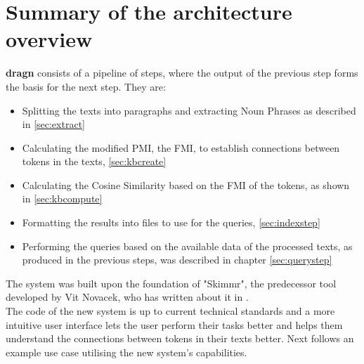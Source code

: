 \section{Summary of the architecture overview}
\textbf{dragn} consists of a pipeline of steps, where the output of the previous step forms the basis for the next step. They are:
\begin{itemize}
\item Splitting the texts into paragraphs and extracting Noun Phrases as described in \ref{sec:extract}
\item Calculating the modified PMI, the FMI, to establish connections between tokens in the texts, \ref{sec:kbcreate}
\item Calculating the Cosine Similarity based on the FMI of the tokens, as shown in \ref{sec:kbcompute}
\item Formatting the results into files to use for the queries, \ref{sec:indexstep}
\item Performing the queries based on the available data of the processed texts, as produced in the previous steps, was described in chapter \ref{sec:querystep}
\end{itemize}
The system was built upon the foundation of "Skimmr", the predecessor tool developed by Vit Novacek, who has written about it in \cite{novavcek2014skimmr}.\\
The code of the new system is up to current technical standards and a more intuitive user interface lets the user perform their tasks better and helps them understand the connections between tokens in their texts better.
Next follows an example use case utilising the new system's capabilities.